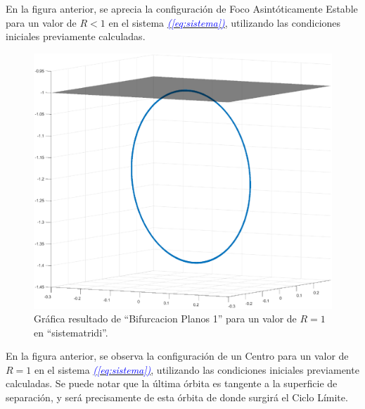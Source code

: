 \documentclass[12pt,a4paper]{report} %
\newcommand{\eref}[1]{\hyperref[#1]{\textcolor{blue}{\textit{(\ref*{#1})}}}}
\begin{document}
	\vspace{0.5cm}\noindent En la figura anterior, se aprecia la configuración de Foco Asintóticamente Estable para un valor de $R<1$ en el sistema \eref{eq:sistema}, utilizando las condiciones iniciales previamente calculadas.
	
	\newpage
	
	\begin{figure}[h]
		\centering
		\includegraphics[width=1\textwidth]{centrocir.eps}
		\caption{Gráfica resultado de ``Bifurcacion Planos 1'' para un valor de $R=1$ en ``sistematridi''.}
		\label{fig:centrocircuito}
	\end{figure}\smallskip
	
		\vspace{0.5cm}\noindent En la figura anterior, se observa la configuración de un Centro para un valor de $R=1$ en el sistema \eref{eq:sistema}, utilizando las condiciones iniciales previamente calculadas. Se puede notar que la última órbita es tangente a la superficie de separación, y será precisamente de esta órbita de donde surgirá el Ciclo Límite.
	
	\newpage
	
\end{document}
